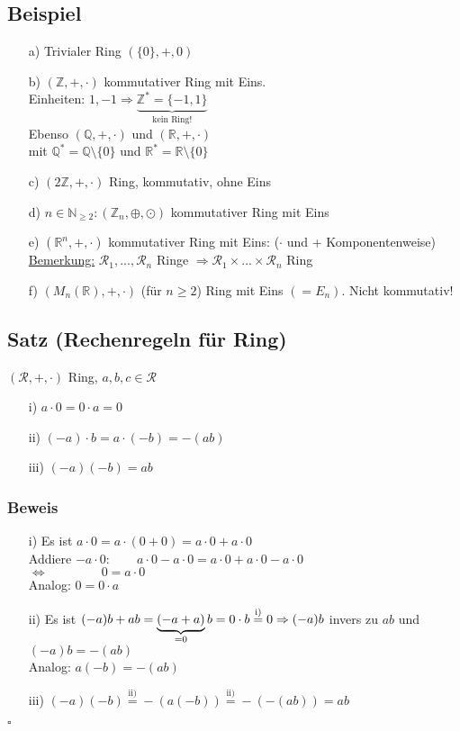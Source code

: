 \documentclass[12pt,titlepage, pdf]{article}
\newcommand{\R}{\mathds{R}}
\newcommand{\uline}[1]{\underline{#1}}
\renewcommand{\>}{\rightarrow}
\renewcommand{\*}{\cdot}
\begin{document}
\subsection{Beispiel}
\begin{itemize}
	\item[a)] Trivialer Ring $(\{0\},+,0)$
	\item[b)] $(\mathbb{Z}, +,\cdot)$ kommutativer Ring mit Eins. \\
	Einheiten: $1, -1\Rightarrow \underbrace{\mathbb{Z}^* = \{-1,1\}}_{\text{kein Ring!}}$\\
	Ebenso $(\mathbb{Q},+,\cdot)$ und $(\mathbb{R},+,\cdot)$ \\
	mit $\mathbb{Q}^* = \mathbb{Q} \setminus \{0\}$ und $\mathbb{R}^* =  \mathbb{R} \setminus \{0\}$
	\item[c)] $(2\mathbb{Z},+,\cdot)$ Ring, kommutativ, ohne Eins
	\item[d)] $n \in \mathbb{N}_{\geq 2}: (\mathbb{Z}_n, \oplus, \odot)$ kommutativer Ring mit Eins
	\item[e)] $(\R^n, + ,\cdot)$ kommutativer Ring mit Eins: ($\cdot$ und + Komponentenweise)\\
	\uline{Bemerkung:} $\mathcal{R}_1,...,\mathcal{R}_n$ Ringe $\Rightarrow \mathcal{R}_1 \times ... \times \mathcal{R}_n$ Ring
	\item[f)] $(M_n(\R),+, \cdot)$ (für $n\geq 2$) Ring mit Eins $(= E_n)$. Nicht kommutativ! 
\end{itemize}
\subsection{Satz (Rechenregeln für Ring)}
$(\mathcal{R}, +,\cdot)$ Ring, $a,b,c \in \mathcal{R}$
\begin{itemize}
	\item[i)] $a \cdot 0 = 0 \cdot a = 0$
	\item[ii)] $(-a) \cdot b = a \cdot (-b) = -(ab)$
	\item[iii)] $(-a)(-b) = ab$
\end{itemize}	
\subsubsection*{Beweis}
\begin{itemize}
	\item[i)] Es ist $a \cdot 0 = a \cdot (0 + 0)= a \cdot 0 + a \cdot 0$\\
	Addiere $-a \cdot 0:\qquad a \cdot 0 - a \cdot 0 = a \cdot 0 + a \cdot 0 - a \cdot 0 $\\
	\noindent\hspace*{30mm}$\Leftrightarrow \qquad\qquad~0 = a \cdot 0$\\
	Analog: $0 = 0 \cdot a$
	\item[ii)] Es ist $(-a)b + ab = \underbrace{(-a+a)}_{=0}b = 0 \cdot b \overset{\textrm{i)}}{=} 0\\
	\Rightarrow (-a)b$ invers zu $ab$ und $(-a)b = -(ab)$ \\
	Analog: $a(-b) = -(ab)$
	\item[iii)] $(-a)(-b) \overset{\textrm{ii)}}{=} -(a(-b)) \overset{\textrm{ii)}}{=} -(-(ab)) = ab$
\end{itemize}
\hfill$\square$
\end{document}
